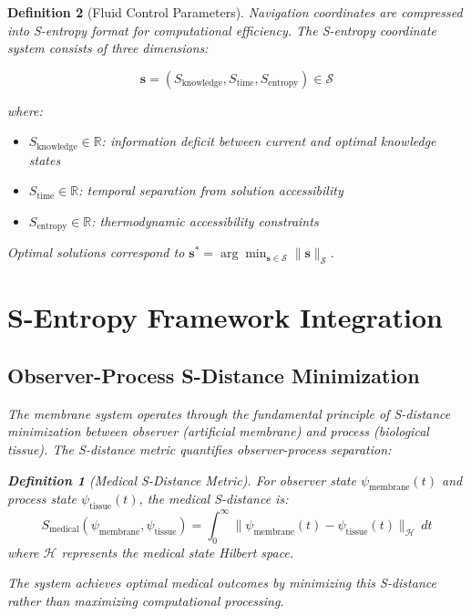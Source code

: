 \documentclass[12pt,a4paper]{article}
\newtheorem{definition}{Definition}
\begin{document}
\begin{definition}[Fluid Control Parameters]
Navigation coordinates are compressed into S-entropy format for computational efficiency. The S-entropy coordinate system consists of three dimensions:

\begin{equation}
\mathbf{s} = (S_{\text{knowledge}}, S_{\text{time}}, S_{\text{entropy}}) \in \mathcal{S}
\end{equation}

where:
\begin{itemize}
\item $S_{\text{knowledge}} \in \mathbb{R}$: information deficit between current and optimal knowledge states
\item $S_{\text{time}} \in \mathbb{R}$: temporal separation from solution accessibility
\item $S_{\text{entropy}} \in \mathbb{R}$: thermodynamic accessibility constraints
\end{itemize}

Optimal solutions correspond to $\mathbf{s}^* = \arg\min_{\mathbf{s} \in \mathcal{S}} \|\mathbf{s}\|_{\mathcal{S}}$.

\section{S-Entropy Framework Integration}

\subsection{Observer-Process S-Distance Minimization}

The membrane system operates through the fundamental principle of S-distance minimization between observer (artificial membrane) and process (biological tissue). The S-distance metric quantifies observer-process separation:

\begin{definition}[Medical S-Distance Metric]
For observer state $\psi_{\text{membrane}}(t)$ and process state $\psi_{\text{tissue}}(t)$, the medical S-distance is:
\begin{equation}
S_{\text{medical}}(\psi_{\text{membrane}}, \psi_{\text{tissue}}) = \int_0^{\infty} \|\psi_{\text{membrane}}(t) - \psi_{\text{tissue}}(t)\|_{\mathcal{H}} \, dt
\end{equation}
where $\mathcal{H}$ represents the medical state Hilbert space.
\end{definition}

The system achieves optimal medical outcomes by minimizing this S-distance rather than maximizing computational processing.


\end{definition}
\end{document}
